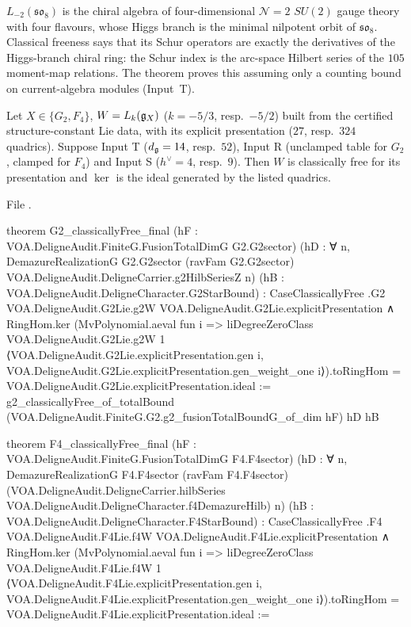 \begin{physics}
$L_{-2}(\mathfrak{so}_8)$ is the chiral algebra of four-dimensional $\mathcal N=2$ $SU(2)$ gauge theory with four
flavours, whose Higgs branch is the minimal nilpotent orbit of $\mathfrak{so}_8$. Classical freeness says that its
Schur operators are exactly the derivatives of the Higgs-branch chiral ring: the Schur index is the arc-space
Hilbert series of the $105$ moment-map relations. The theorem proves this assuming only a counting bound on
current-algebra modules (Input~T).
\end{physics}

\begin{theorem}\label{l27:thm:G2F4}
Let $X\in\{G_2,F_4\}$, $W=L_k(\mathfrak g_X)$ ($k=-5/3$, resp.\ $-5/2$) built from the certified structure-constant Lie data, with
its explicit presentation ($27$, resp.\ $324$ quadrics). Suppose Input T ($d_{\mathfrak g}=14$, resp.\ $52$), Input R (unclamped table for
$G_2$, clamped for $F_4$) and Input S ($h^\vee=4$, resp.\ $9$). Then $W$ is classically free for its presentation and $\ker$ is the ideal
generated by the listed quadrics.
\end{theorem}
\noindent File .
\begin{leancode}
theorem G2_classicallyFree_final (hF : VOA.DeligneAudit.FiniteG.FusionTotalDimG G2.G2sector)
    (hD : ∀ n, DemazureRealizationG G2.G2sector (ravFam G2.G2sector)
      VOA.DeligneAudit.DeligneCarrier.g2HilbSeriesZ n)
    (hB : VOA.DeligneAudit.DeligneCharacter.G2StarBound) :
    CaseClassicallyFree .G2 VOA.DeligneAudit.G2Lie.g2W VOA.DeligneAudit.G2Lie.explicitPresentation ∧
      RingHom.ker (MvPolynomial.aeval fun i =>
        liDegreeZeroClass VOA.DeligneAudit.G2Lie.g2W 1
          ⟨VOA.DeligneAudit.G2Lie.explicitPresentation.gen i,
            VOA.DeligneAudit.G2Lie.explicitPresentation.gen_weight_one i⟩).toRingHom =
        VOA.DeligneAudit.G2Lie.explicitPresentation.ideal :=
  g2_classicallyFree_of_totalBound (VOA.DeligneAudit.FiniteG.G2.g2_fusionTotalBoundG_of_dim hF) hD hB
\end{leancode}
\begin{leancode}
theorem F4_classicallyFree_final (hF : VOA.DeligneAudit.FiniteG.FusionTotalDimG F4.F4sector)
    (hD : ∀ n, DemazureRealizationG F4.F4sector (ravFam F4.F4sector)
      (VOA.DeligneAudit.DeligneCarrier.hilbSeries VOA.DeligneAudit.DeligneCharacter.f4DemazureHilb) n)
    (hB : VOA.DeligneAudit.DeligneCharacter.F4StarBound) :
    CaseClassicallyFree .F4 VOA.DeligneAudit.F4Lie.f4W VOA.DeligneAudit.F4Lie.explicitPresentation ∧
      RingHom.ker (MvPolynomial.aeval fun i =>
        liDegreeZeroClass VOA.DeligneAudit.F4Lie.f4W 1
          ⟨VOA.DeligneAudit.F4Lie.explicitPresentation.gen i,
            VOA.DeligneAudit.F4Lie.explicitPresentation.gen_weight_one i⟩).toRingHom =
        VOA.DeligneAudit.F4Lie.explicitPresentation.ideal :=
\end{leancode}

